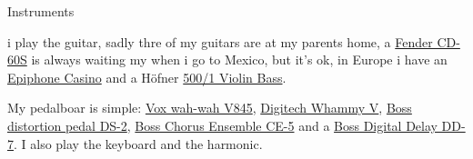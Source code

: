 \begin{accordion}{Instruments}

i play the guitar, sadly thre of my guitars are at my parents home, a
\href{https://fr.fender.com/products/cd-60s-dreadnought-lh-natural-wn?variant=49498536083743}{Fender
CD-60S} is always waiting my when i go to Mexico, but it's ok, in Europe i have
an
\href{https://www.gibson.com/en-eu/products/epiphone-casino-vintage-sunburst-left-handed?view=epiphone}{Epiphone
Casino} and a Höfner
\href{https://www.hofner.com/en-gb/violin-bass/500-1/}{500/1 Violin Bass}.

My pedalboar is simple:
\href{https://voxamps.com/fr/produit/v845-wah-pedal/}{Vox wah-wah V845},
\href{https://digitech.com/dp/whammy/}{Digitech Whammy V},
\href{https://www.boss.info/fr/products/ds-2/}{Boss distortion pedal DS-2},
\href{https://www.boss.info/fr/products/ce-5/}{Boss Chorus Ensemble CE-5} and a
\href{https://www.boss.info/fr/products/dd-7/}{Boss Digital Delay DD-7}. I also
play the keyboard and the harmonic.

\end{accordion}

